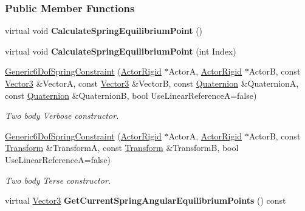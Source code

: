 \subsubsection*{Public Member Functions}
\begin{DoxyCompactItemize}
\item 
\hypertarget{classphys_1_1Generic6DofSpringConstraint_aaec332a131a3e17c19c96a8ce29c9fae}{
virtual void {\bfseries CalculateSpringEquilibriumPoint} ()}
\label{classphys_1_1Generic6DofSpringConstraint_aaec332a131a3e17c19c96a8ce29c9fae}

\item 
\hypertarget{classphys_1_1Generic6DofSpringConstraint_ad1bab377a08cc0d42dd3135779611f4a}{
virtual void {\bfseries CalculateSpringEquilibriumPoint} (int Index)}
\label{classphys_1_1Generic6DofSpringConstraint_ad1bab377a08cc0d42dd3135779611f4a}

\item 
\hyperlink{classphys_1_1Generic6DofSpringConstraint_a826580505965216b75ea41f26e2ad92f}{Generic6DofSpringConstraint} (\hyperlink{classphys_1_1ActorRigid}{ActorRigid} $\ast$ActorA, \hyperlink{classphys_1_1ActorRigid}{ActorRigid} $\ast$ActorB, const \hyperlink{classphys_1_1Vector3}{Vector3} \&VectorA, const \hyperlink{classphys_1_1Vector3}{Vector3} \&VectorB, const \hyperlink{classphys_1_1Quaternion}{Quaternion} \&QuaternionA, const \hyperlink{classphys_1_1Quaternion}{Quaternion} \&QuaternionB, bool UseLinearReferenceA=false)
\begin{DoxyCompactList}\small\item\em Two body Verbose constructor. \item\end{DoxyCompactList}\item 
\hyperlink{classphys_1_1Generic6DofSpringConstraint_adb6c637cc1b18344c3c3e6cfe10dbd49}{Generic6DofSpringConstraint} (\hyperlink{classphys_1_1ActorRigid}{ActorRigid} $\ast$ActorA, \hyperlink{classphys_1_1ActorRigid}{ActorRigid} $\ast$ActorB, const \hyperlink{classphys_1_1Transform}{Transform} \&TransformA, const \hyperlink{classphys_1_1Transform}{Transform} \&TransformB, bool UseLinearReferenceA=false)
\begin{DoxyCompactList}\small\item\em Two body Terse constructor. \item\end{DoxyCompactList}\item 
\hypertarget{classphys_1_1Generic6DofSpringConstraint_a87c90750b655ae7f9f1616a660062cf1}{
virtual \hyperlink{classphys_1_1Vector3}{Vector3} {\bfseries GetCurrentSpringAngularEquilibriumPoints} () const }
\label{classphys_1_1Generic6DofSpringConstraint_a87c90750b655ae7f9f1616a660062cf1}


\end{DoxyCompactItemize}
